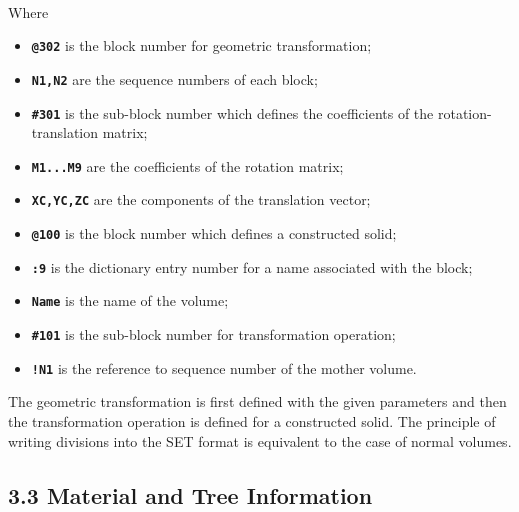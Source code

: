 \\
 
\newpage
 
\noindent Where\\[-0.7cm]
\begin{itemize}
\item {\bf{\tt @302}} is the block number for geometric
 transformation;\\[-0.7cm]
\item {\bf{\tt N1,N2}} are the sequence numbers of each block;\\[-0.7cm]
\item {\bf{\tt \#301}} is the sub-block number which defines the coefficients
of the rotation-translation matrix;\\[-0.7cm]
\item {\bf{\tt M1...M9}} are the  coefficients of the rotation matrix;\\[-0.7cm]
\item {\bf{\tt XC,YC,ZC}} are the components of the translation
 vector;\\[-0.7cm]
\item {\bf{\tt @100}} is the block number which defines a constructed
 solid;\\[-0.7cm]
\item {\bf{\tt :9}}  is the dictionary entry number for a name associated
with the block;\\[-0.7cm]
\item {\bf{\tt Name}} is the name of the volume;\\[-0.7cm]
\item {\bf{\tt \#101}} is the sub-block number for transformation
 operation;\\[-0.7cm]
\item {\bf{\tt !N1}} is the reference to sequence number of the mother
volume.\\[-0.5cm]
\end{itemize}
 
The geometric transformation is first defined with the given parameters
and then the transformation operation is defined for a constructed solid.
The principle of writing divisions into the SET format is
equivalent to the case of normal volumes.
 
\subsection*{3.3 Material and Tree Information}
 
